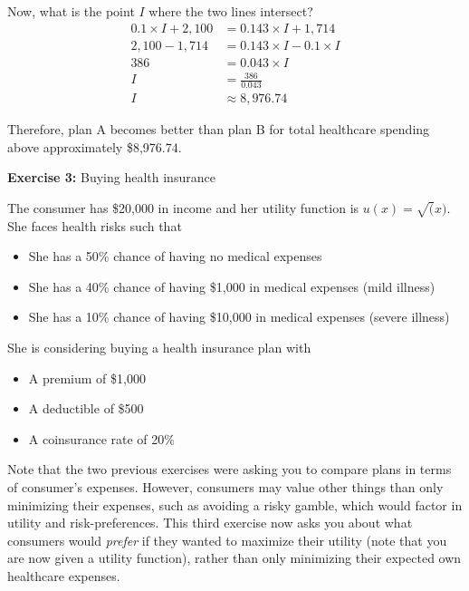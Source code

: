 \documentclass[12pt]{article}
\begin{document}
\begin{enumerate}
{    Now, what is the point $I$ where the two lines intersect?
    \begin{align*}
        0.1 \times I + 2,100 &= 0.143 \times I + 1,714 \\
        2,100 - 1,714 &= 0.143 \times I - 0.1 \times I \\
        386 &= 0.043 \times I \\
        I &= \frac{386}{0.043} \\
        I &\approx 8,976.74
    \end{align*}

    Therefore, plan A becomes better than plan B for total healthcare spending above approximately \$8,976.74.

    }

\end{enumerate}

\vspace{1em}

\textbf{Exercise 3:} Buying health insurance

The consumer has \$20,000 in income and her utility function is $u(x) = \sqrt(x)$.\\
She faces health risks such that
\begin{itemize}
    \item[-] She has a 50\% chance of having no medical expenses
    \item[-] She has a 40\% chance of having \$1,000 in medical expenses (mild illness)
    \item[-] She has a 10\% chance of having \$10,000 in medical expenses (severe illness)
\end{itemize}
\vspace{3mm}

She is considering buying a health insurance plan with
\begin{itemize}
    \item[-] A premium of \$1,000
    \item[-] A deductible of \$500
    \item[-] A coinsurance rate of 20\%
\end{itemize}

{\color{red} Note that the two previous exercises were asking you to compare plans in terms of consumer's expenses.
However, consumers may value other things than only minimizing their expenses,
such as avoiding a risky gamble, which would factor in utility and risk-preferences.
This third exercise now asks you about what consumers would \textit{prefer} if they wanted to maximize their utility
(note that you are now given a utility function),
rather than only minimizing their expected own healthcare expenses.
}
\end{document}
